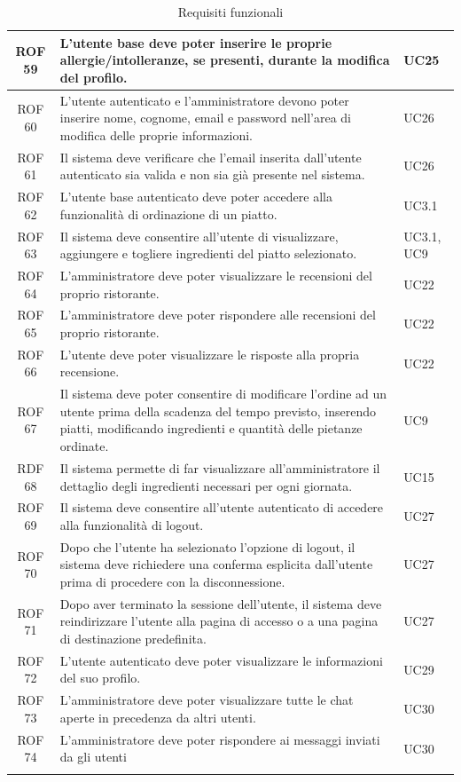 \documentclass[12pt, oneside]{article}
\begin{document}
\begin{longtable}{|c|p{14cm}|p{2cm}|}
    ROF 59 & L'utente base deve poter inserire le proprie allergie/intolleranze, se presenti, durante la modifica del profilo.  & UC25  \\
    \hline

    ROF 60 & L'utente autenticato e l'amministratore devono poter inserire nome, cognome, email e password nell'area di modifica delle proprie informazioni.  & UC26  \\
    \hline
    ROF 61 & Il sistema deve verificare che l'email inserita dall'utente autenticato sia valida e non sia già presente nel sistema.  & UC26  \\
    \hline
    ROF 62 & L'utente base autenticato deve poter accedere alla funzionalità di ordinazione di un piatto.  & UC3.1  \\
    \hline
    ROF 63 & Il sistema deve consentire all'utente di visualizzare, aggiungere e togliere ingredienti del piatto selezionato.  & UC3.1, UC9  \\
    \hline
    ROF 64 & L'amministratore deve poter visualizzare le recensioni del proprio ristorante. & UC22 \\ 
    \hline
    ROF 65 & L'amministratore deve poter rispondere alle recensioni del proprio ristorante. & UC22 \\
    \hline
    ROF 66 & L'utente deve poter visualizzare le risposte alla propria recensione. & UC22 \\
    \hline
    ROF 67 & Il sistema deve poter consentire di modificare l'ordine ad un utente prima della scadenza del tempo previsto, inserendo piatti, modificando ingredienti e quantità delle pietanze ordinate. & UC9 \\
    \hline
    RDF 68 & Il sistema permette di far visualizzare all'amministratore il dettaglio degli ingredienti necessari per ogni giornata. & UC15 \\
    \hline
    ROF 69 & Il sistema deve consentire all'utente autenticato di accedere alla funzionalità di logout. & UC27 \\
    \hline
    ROF 70 & Dopo che l'utente ha selezionato l'opzione di logout, il sistema deve richiedere una conferma esplicita dall'utente prima di procedere con la disconnessione. & UC27 \\ 
    \hline
    ROF 71 & Dopo aver terminato la sessione dell'utente, il sistema deve reindirizzare l'utente alla pagina di accesso o a una pagina di destinazione predefinita. & UC27 \\
    \hline
    ROF 72 & L'utente autenticato deve poter visualizzare le informazioni del suo profilo. & UC29 \\ 
    \hline

    ROF 73 & L'amministratore deve poter visualizzare tutte le chat aperte in precedenza da altri utenti. & UC30 \\
    \hline
    ROF 74 & L'amministratore deve poter rispondere ai messaggi inviati da gli utenti & UC30 \\
    \hline
\caption{Requisiti funzionali}
\end{longtable}
\end{document}
